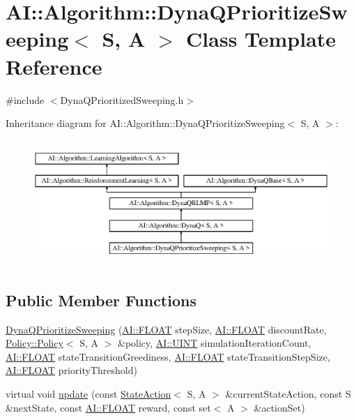 \hypertarget{classAI_1_1Algorithm_1_1DynaQPrioritizeSweeping}{\section{A\-I\-:\-:Algorithm\-:\-:Dyna\-Q\-Prioritize\-Sweeping$<$ S, A $>$ Class Template Reference}
\label{classAI_1_1Algorithm_1_1DynaQPrioritizeSweeping}
}


{\ttfamily \#include $<$Dyna\-Q\-Prioritized\-Sweeping.\-h$>$}

Inheritance diagram for A\-I\-:\-:Algorithm\-:\-:Dyna\-Q\-Prioritize\-Sweeping$<$ S, A $>$\-:\begin{figure}[H]
\begin{center}
\leavevmode
\includegraphics[height=4.794520cm]{classAI_1_1Algorithm_1_1DynaQPrioritizeSweeping}
\end{center}
\end{figure}
\subsection*{Public Member Functions}
\begin{DoxyCompactItemize}
\item 
\hyperlink{classAI_1_1Algorithm_1_1DynaQPrioritizeSweeping_ac1b32e8772e967a3bb74ac34708e4dfe}{Dyna\-Q\-Prioritize\-Sweeping} (\hyperlink{namespaceAI_a41b74884a20833db653dded3918e05c3}{A\-I\-::\-F\-L\-O\-A\-T} step\-Size, \hyperlink{namespaceAI_a41b74884a20833db653dded3918e05c3}{A\-I\-::\-F\-L\-O\-A\-T} discount\-Rate, \hyperlink{classAI_1_1Algorithm_1_1Policy_1_1Policy}{Policy\-::\-Policy}$<$ S, A $>$ \&policy, \hyperlink{namespaceAI_ab6e14dc1e659854858a87e511f1439ec}{A\-I\-::\-U\-I\-N\-T} simulation\-Iteration\-Count, \hyperlink{namespaceAI_a41b74884a20833db653dded3918e05c3}{A\-I\-::\-F\-L\-O\-A\-T} state\-Transition\-Greediness, \hyperlink{namespaceAI_a41b74884a20833db653dded3918e05c3}{A\-I\-::\-F\-L\-O\-A\-T} state\-Transition\-Step\-Size, \hyperlink{namespaceAI_a41b74884a20833db653dded3918e05c3}{A\-I\-::\-F\-L\-O\-A\-T} priority\-Threshold)
\item 
virtual void \hyperlink{classAI_1_1Algorithm_1_1DynaQPrioritizeSweeping_ad08b55f3cf927189dd31abf9fc1c2959}{update} (const \hyperlink{classAI_1_1StateAction}{State\-Action}$<$ S, A $>$ \&current\-State\-Action, const S \&next\-State, const \hyperlink{namespaceAI_a41b74884a20833db653dded3918e05c3}{A\-I\-::\-F\-L\-O\-A\-T} reward, const set$<$ A $>$ \&action\-Set)
\end{DoxyCompactItemize}
